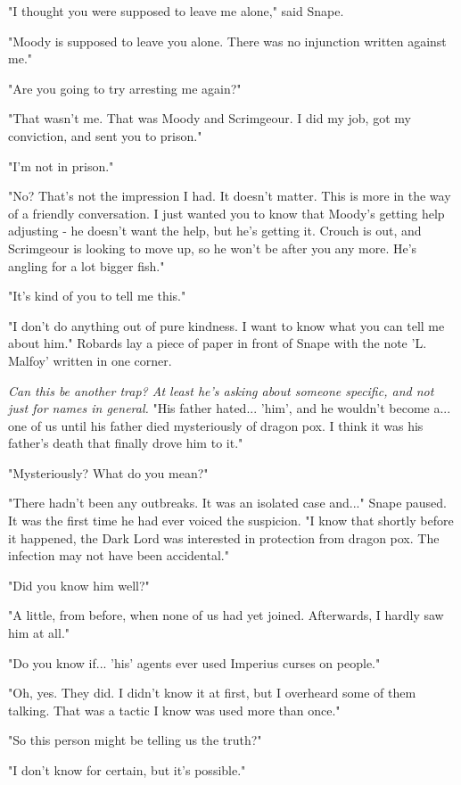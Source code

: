 \documentclass[a4paper,11pt]{article}
\begin{document}
"I thought you were supposed to leave me alone," said Snape.

"Moody is supposed to leave you alone. There was no injunction written against me."

"Are you going to try arresting me again?"

"That wasn't me. That was Moody and Scrimgeour. I did my job, got my conviction, and sent you to prison."

"I'm not in prison."

"No? That's not the impression I had. It doesn't matter. This is more in the way of a friendly conversation. I just wanted you to know that Moody's getting help adjusting - he doesn't want the help, but he's getting it. Crouch is out, and Scrimgeour is looking to move up, so he won't be after you any more. He's angling for a lot bigger fish."

"It's kind of you to tell me this."

"I don't do anything out of pure kindness. I want to know what you can tell me about him." Robards lay a piece of paper in front of Snape with the note 'L. Malfoy' written in one corner.

\emph{Can this be another trap? At least he's asking about someone specific, and not just for names in general.} "His father hated... 'him', and he wouldn't become a... one of us until his father died mysteriously of dragon pox. I think it was his father's death that finally drove him to it."

"Mysteriously? What do you mean?"

"There hadn't been any outbreaks. It was an isolated case and..." Snape paused. It was the first time he had ever voiced the suspicion. "I know that shortly before it happened, the Dark Lord was interested in protection from dragon pox. The infection may not have been accidental."

"Did you know him well?"

"A little, from before, when none of us had yet joined. Afterwards, I hardly saw him at all."

"Do you know if... 'his' agents ever used Imperius curses on people."

"Oh, yes. They did. I didn't know it at first, but I overheard some of them talking. That was a tactic I know was used more than once."

"So this person might be telling us the truth?"

"I don't know for certain, but it's possible."
\end{document}
